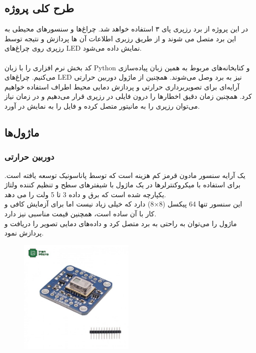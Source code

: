 \documentclass[12pt]{article}
\begin{document}
\subsection{طرح کلی پروژه}

در این پروژه از برد رزپری پای ۳  استفاده خواهد شد. چراغ‌ها و سنسورهای محیطی به این برد متصل می شوند و از طریق رزبری اطلاعات آن ها پردازش و نتیجه توسط رزپری روی چراغ‌های LED نمایش داده می‌شود.
\\
\\
کد بخش نرم افزاری را با زبان Python و کتابخانه‌‌های مربوط به همین زبان پیاده‌سازی می‌کنیم. چراغ‌های LED نیز به برد وصل می‌شوند. همچنین از ماژول دوربین حرارتی آرایه‌ای  برای تصویربرداری حرارتی و پردازش دمایی محیط اطراف استفاده خواهیم کرد. همچنین زمان دقیق اخطار‌ها را درون فایلی در رزپری قرار می‌دهیم و در زمان نیاز می‌توان رزپری را به مانیتور متصل کرده و فایل را به نمایش در آورد. 


\subsection{ماژول‌ها}

\subsubsection{دوربین حرارتی}

یک آرایه سنسور مادون قرمز کم هزینه است که توسط پاناسونیک توسعه یافته است. برای استفاده با میکروکنترلرها در یک ماژول با شیفترهای سطح و تنظیم کننده ولتاژ یکپارچه شده است که برق و داده 3 تا 5 ولت را می دهد.
\\
این سنسور تنها 64 پیکسل (8×8) دارد که خیلی زیاد نیست اما برای آزمایش کافی و کار با آن ساده است، همچنین قیمت مناسبی نیز دارد. 
\\
ماژول را می‌توان به راحتی به برد متصل کرد و داده‌های دمایی تصویر را دریافت و پردازش نمود.


\begin{figure}[h]
	\begin{center}
		\includegraphics[width=0.5\textwidth]{AMG8833-module-1-500x500.jpg}
	\end{center}
	\caption{}
\end{figure}
\end{document}
